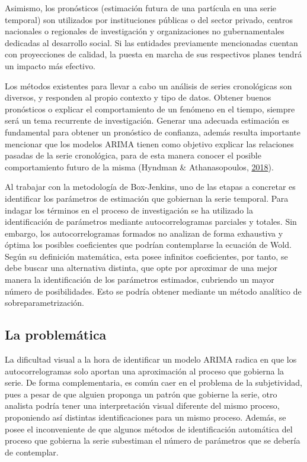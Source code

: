 \documentclass[
]{article}
\begin{document}
Asimismo, los pronósticos (estimación futura de una partícula en una
serie temporal) son utilizados por instituciones públicas o del sector
privado, centros nacionales o regionales de investigación y
organizaciones no gubernamentales dedicadas al desarrollo social. Si las
entidades previamente mencionadas cuentan con proyecciones de calidad,
la puesta en marcha de sus respectivos planes tendrá un impacto más
efectivo.

Los métodos existentes para llevar a cabo un análisis de series
cronológicas son diversos, y responden al propio contexto y tipo de
datos. Obtener buenos pronósticos o explicar el comportamiento de un
fenómeno en el tiempo, siempre será un tema recurrente de investigación.
Generar una adecuada estimación es fundamental para obtener un
pronóstico de confianza, además resulta importante mencionar que los
modelos ARIMA tienen como objetivo explicar las relaciones pasadas de la
serie cronológica, para de esta manera conocer el posible comportamiento
futuro de la misma (Hyndman \& Athanasopoulos,
\protect\hyperlink{ref-hyndman2018forecasting}{2018}).

Al trabajar con la metodología de Box-Jenkins, uno de las etapas a
concretar es identificar los parámetros de estimación que gobiernan la
serie temporal. Para indagar los términos en el proceso de investigación
se ha utilizado la identificación de parámetros mediante
autocorrelogramas parciales y totales. Sin embargo, los
autocorrelogramas formados no analizan de forma exhaustiva y óptima los
posibles coeficientes que podrían contemplarse la ecuación de Wold.
Según su definición matemática, esta posee infinitos coeficientes, por
tanto, se debe buscar una alternativa distinta, que opte por aproximar
de una mejor manera la identificación de los parámetros estimados,
cubriendo un mayor número de posibilidades. Esto se podría obtener
mediante un método analítico de sobreparametrización.

\subsection{La problemática}

La dificultad visual a la hora de identificar un modelo ARIMA radica en
que los autocorrelogramas solo aportan una aproximación al proceso que
gobierna la serie. De forma complementaria, es común caer en el problema
de la subjetividad, pues a pesar de que alguien proponga un patrón que
gobierne la serie, otro analista podría tener una interpretación visual
diferente del mismo proceso, proponiendo así distintas identificaciones
para un mismo proceso. Además, se posee el inconveniente de que algunos
métodos de identificación automática del proceso que gobierna la serie
subestiman el número de parámetros que se debería de contemplar.
\end{document}
